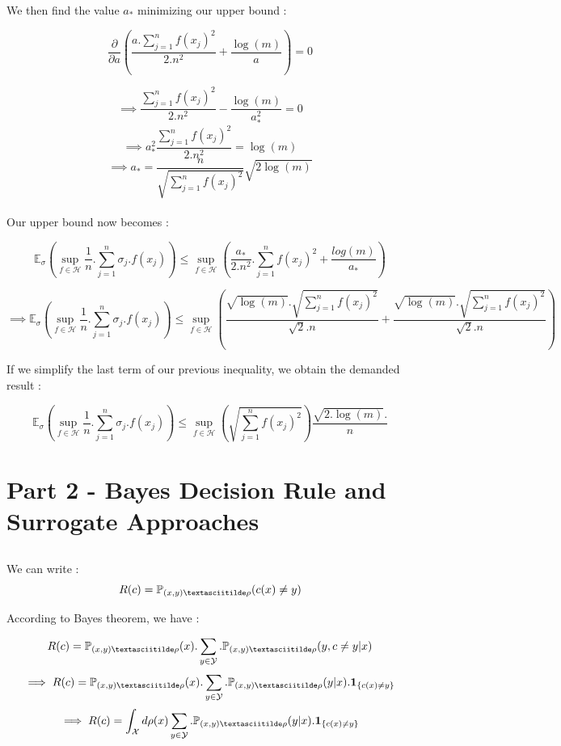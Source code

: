 \documentclass[final,3p,times,12pt]{article}
\begin{document}
We then find the value $a_*$ minimizing our upper bound :

\[
\frac{\partial}{\partial a} \left( \frac{a.\sum_{j=1}^nf(x_j)^2}{2.n^2} + \frac{\log(m)}{a}\right) = 0
\]

\[ \implies
\frac{\sum_{j=1}^nf(x_j)^2}{2.n^2} -\frac{\log(m)}{a_*^2}  = 0
\]
\[ \implies
a_*^2 \frac{\sum_{j=1}^nf(x_j)^2}{2.n^2} = \log(m)
\]
\[ \implies
a_* = \frac{n}{\sqrt{\sum_{j=1}^nf(x_j)^2}} \sqrt{2 \log(m)}
\]\\

Our upper bound now becomes : 

\[
\mathbb{E}_{\sigma}\left(\sup_{f\in \mathcal{H}} \frac{1}{n}.\sum_{j=1}^n \sigma_j.f(x_j)\right) \leq \sup_{f\in \mathcal{H}}\left(\frac{a_*}{2.n^2}.\sum_{j=1}^nf(x_j)^2 + \frac{log(m)}{a_*}\right)
\]

\[ \implies
\mathbb{E}_{\sigma}\left(\sup_{f\in \mathcal{H}} \frac{1}{n}.\sum_{j=1}^n \sigma_j.f(x_j)\right) \leq \sup_{f\in \mathcal{H}}\left(\frac{\sqrt{\log(m)}.\sqrt{\sum_{j=1}^nf(x_j)^2}}{\sqrt{2}.n} + \frac{\sqrt{\log(m)}.\sqrt{\sum_{j=1}^nf(x_j)^2}}{\sqrt{2}.n}\right)
\]

If we simplify the last term of our previous inequality, we obtain the demanded result : 

\[
\mathbb{E}_{\sigma}\left(\sup_{f\in \mathcal{H}} \frac{1}{n}.\sum_{j=1}^n \sigma_j.f(x_j)\right) \leq \sup_{f\in \mathcal{H}}\left(\sqrt{\sum_{j=1}^nf(x_j)^2}\right)\frac{\sqrt{2.\log(m)}.}{n}
\]





   
\section{Part 2 - Bayes Decision Rule and Surrogate Approaches
}

\subsection{}

We can write : 
\[
R(c) = \mathbb{P}_{(x,y) \textasciitilde \rho }(c(x)\neq y)
\]

According to Bayes theorem, we have :

\[
R(c) = \mathbb{P}_{(x,y) \textasciitilde \rho }(x). \sum_{y \in \mathcal{Y}}.\mathbb{P}_{(x,y) \textasciitilde \rho }(y, c\neq y|x)
\]
\[ \implies
R(c) =\mathbb{P}_{(x,y) \textasciitilde \rho }(x). \sum_{y \in \mathcal{Y}}.\mathbb{P}_{(x,y) \textasciitilde \rho }(y|x).\mathbf{1}_{\{c(x)\neq y\}}
\]
\[ \implies
R(c) = \int_{\mathcal{X}} d\rho(x) \sum_{y \in \mathcal{Y}}.\mathbb{P}_{(x,y) \textasciitilde \rho }(y|x).\mathbf{1}_{\{c(x)\neq y\}}
\]
\end{document}
